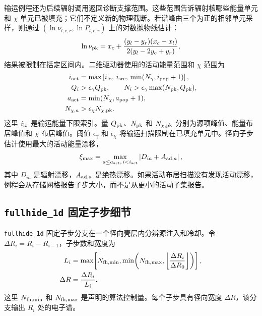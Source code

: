 \documentclass[twocolumn]{aastex702}
\begin{document}
输运例程还为后续辐射调用返回诊断支撑范围。这些范围告诉辐射核哪些能量单元和 \(\chi\) 单元已被填充；它们不定义新的物理截断。若谱峰由三个为正的相邻单元采样，则通过 \((\ln\nu_{l,c,r},\ln P_{l,c,r})\) 上的对数抛物线估计：
\begin{equation}
\ln\nu_{\rm pk}
=x_c+\frac{(y_l-y_r)(x_c-x_l)}
{2(y_l-2y_c+y_r)},
\end{equation}
结果被限制在括定区间内。二维驱动器使用的活动能量范围和 \(\chi\) 范围为
\begin{equation}
\begin{aligned}
i_{\rm act}&=\max\left[i_{\rm lo},\,i_{\rm src},\,
\min(N_\gamma,i_{\rm pop}+1)\right],\\
Q_i&>\epsilon_\gamma Q_{\rm pk},\qquad
N_i>\epsilon_\gamma\max(N_{\rm pk},Q_{\rm pk}),\\
a_{\rm act}&=\min(N_\chi,a_{\rm pop}+1),\\
N_{\chi,a}&>\epsilon_\chi N_{\chi,\rm pk}.
\end{aligned}
\end{equation}
这里 \(i_{\rm lo}\) 是输运能量下限索引。量 \(Q_{\rm pk}\)、\(N_{\rm pk}\) 和 \(N_{\chi,\rm pk}\) 分别为源项峰值、能量布居峰值和 \(\chi\) 布居峰值。阈值 \(\epsilon_\gamma\) 和 \(\epsilon_\chi\) 将输运扫描限制在已填充单元中。径向子步估计使用最大的活动能量漂移，
\begin{equation}
\xi_{\max}=\max_{a\le a_{\rm act},\,i<i_{\rm act}}
\left|D_{ia}+A_{{\rm ad},a}\right|,
\end{equation}
其中 \(D_{ia}\) 是辐射漂移，\(A_{{\rm ad},a}\) 是绝热漂移。如果活动布居扫描没有发现活动漂移，例程会从存储网格报告子步大小，而不是从更小的活动子集报告。

\subsection{\texttt{fullhide\_1d} 固定子步细节}

\texttt{fullhide\_1d} 固定子步分支在一个径向壳层内分辨源注入和冷却。令 \(\Delta R_i=R_i-R_{i-1}\)，子步数和宽度为
\begin{equation}
\begin{aligned}
L_i&=\max\!\left[
N_{\rm fh,min},
\min\!\left(N_{\rm fh,max},
\left\lfloor\frac{\Delta R_i}{\Delta R_0}\right\rfloor\right)
\right],\\
\Delta R&=\frac{\Delta R_i}{L_i}.
\end{aligned}
\end{equation}
这里 \(N_{\rm fh,min}\) 和 \(N_{\rm fh,max}\) 是声明的算法控制量。每个子步具有径向宽度 \(\Delta R\)，该分支输出 \(R_i\) 处的电子谱。
\end{document}
